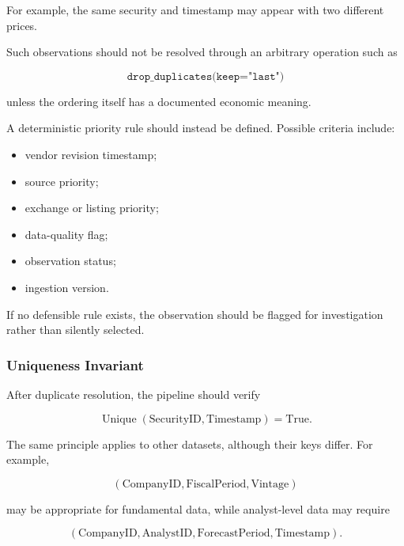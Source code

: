 \documentclass[11pt,a4paper]{article}
\begin{document}
For example, the same security and timestamp may appear with two different
prices.

Such observations should not be resolved through an arbitrary operation such
as

\begin{equation}
\texttt{drop\_duplicates(keep="last")}
\end{equation}

unless the ordering itself has a documented economic meaning.

A deterministic priority rule should instead be defined. Possible criteria
include:

\begin{itemize}
    \item vendor revision timestamp;
    \item source priority;
    \item exchange or listing priority;
    \item data-quality flag;
    \item observation status;
    \item ingestion version.
\end{itemize}

If no defensible rule exists, the observation should be flagged for
investigation rather than silently selected.


\subsubsection{Uniqueness Invariant}

After duplicate resolution, the pipeline should verify

\begin{equation}
\boxed{
\operatorname{Unique}
\left(
\mathrm{SecurityID},
\mathrm{Timestamp}
\right)
=
\mathrm{True}.
}
\end{equation}

The same principle applies to other datasets, although their keys differ. For
example,

\begin{equation}
(\mathrm{CompanyID},
\mathrm{FiscalPeriod},
\mathrm{Vintage})
\end{equation}

may be appropriate for fundamental data, while analyst-level data may require

\begin{equation}
(\mathrm{CompanyID},
\mathrm{AnalystID},
\mathrm{ForecastPeriod},
\mathrm{Timestamp}).
\end{equation}
\end{document}
